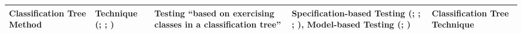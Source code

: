 \begin{table}[hbtp!]
\begin{tabularx}{\linewidth}{|m{1.7cm}|m{4.2cm}|X|m{7.7cm}|m{2.8cm}|}
        Classification Tree Method & Technique (\citealp[p.~22]{IEEE2022}; \citeyear[pp.~2,~12,~Fig.~2]{IEEE2021}; \citealpISTQB{}) & Testing ``based on exercising classes in a classification tree'' \citep[p.~22]{IEEE2021}                                                             & Specification-based Testing (\citealp[p.~22]{IEEE2022}; \citeyear[pp.~2,~12,~Fig.~2]{IEEE2021}; \citealpISTQB{}; \citealp[p.~47]{Firesmith2015}), Model-based Testing (\citealp[p.~13]{IEEE2022}; \citeyear[pp.~6,~12]{IEEE2021}) & Classification Tree Technique \citepISTQB{}   \\[1.5cm] %
        \hline
    \end{tabularx}
\end{table}